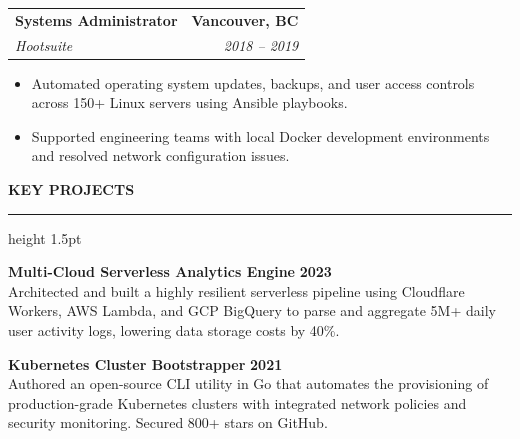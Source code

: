 \documentclass[10pt,letterpaper]{article}
\makeatletter
\newcommand{\mainsection}[1]{%
  \vspace{5mm}%
  {\Large\bfseries\color{headertext}\uppercase{#1}}%
  \par\vspace{1.5mm}%
  {\color{accent}\hrule height 1.5pt}%
  \par\vspace{3mm}%
}
\newcommand{\experienceitem}[4]{%
  \noindent%
  \begin{tabularx}{\linewidth}{@{} X @{\hspace{4mm}} r @{}}%
    {\large\bfseries\color{headertext} #1} & {\bfseries\color{accent} #3} \\%
    {\itshape\color{bodytext} #2} & {\itshape\color{bodytext} #4} \\%
  \end{tabularx}%
  \par\vspace{1.5mm}%
}
\makeatother
\begin{document}
\begin{minipage}[t]{5.4in}
  \vspace{4mm}
  \experienceitem{Systems Administrator}{Hootsuite}{Vancouver, BC}{2018 -- 2019}
  \begin{itemize}[leftmargin=*, nosep, itemsep=2.5pt, topsep=1pt]
    \item Automated operating system updates, backups, and user access controls across 150+ Linux servers using Ansible playbooks.
    \item Supported engineering teams with local Docker development environments and resolved network configuration issues.
  \end{itemize}
  
  \mainsection{Key Projects}
  
  \noindent\textbf{\large\color{headertext} Multi-Cloud Serverless Analytics Engine} \hfill \textbf{2023} \\
  Architected and built a highly resilient serverless pipeline using Cloudflare Workers, AWS Lambda, and GCP BigQuery to parse and aggregate 5M+ daily user activity logs, lowering data storage costs by 40\%.
  
  \vspace{3mm}
  \noindent\textbf{\large\color{headertext} Kubernetes Cluster Bootstrapper} \hfill \textbf{2021} \\
  Authored an open-source CLI utility in Go that automates the provisioning of production-grade Kubernetes clusters with integrated network policies and security monitoring. Secured 800+ stars on GitHub.
  
\end{minipage}
\end{document}
